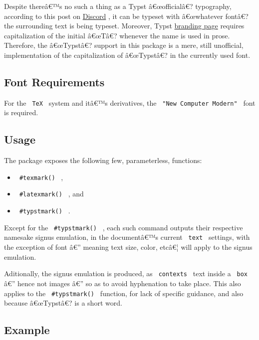 Despite thereâ€™s no such a thing as a Typst â€œofficialâ€? typography,
according to this post on
\href{https://discord.com/channels/1054443721975922748/1054443722592497796/1107039477714665522}{Discord}
, it can be typeset with â€œwhatever fontâ€? the surrounding text is
being typeset. Moreover, Typst
\href{https://typst.app/legal/brand/}{branding page} requires
capitalization of the initial â€œTâ€? whenever the name is used in
prose. Therefore, the â€œTypstâ€? support in this package is a mere,
still unofficial, implementation of the capitalization of â€œTypstâ€? in
the currently used font.

\subsection{Font Requirements}\label{font-requirements}

For the \texttt{\ TeX\ } system and itâ€™s derivatives, the
\texttt{\ "New\ Computer\ Modern"\ } font is required.

\subsection{Usage}\label{usage}

The package exposes the following few, parameterless, functions:

\begin{itemize}
\tightlist
\item
  \texttt{\ \#texmark()\ } ,
\item
  \texttt{\ \#latexmark()\ } , and
\item
  \texttt{\ \#typstmark()\ } .
\end{itemize}

Except for the \texttt{\ \#typstmark()\ } , each such command outputs
their respective namesake signus emulation, in the documentâ€™s current
\texttt{\ text\ } settings, with the exception of font â€'' meaning text
size, color, etcâ€¦ will apply to the signus emulation.

Aditionally, the signus emulation is produced, as \texttt{\ contexts\ }
text inside a \texttt{\ box\ } â€'' hence not images â€'' so as to avoid
hyphenation to take place. This also applies to the
\texttt{\ \#typstmark()\ } function, for lack of specific guidance, and
also because â€œTypstâ€? is a short word.

\subsection{Example}\label{example}

